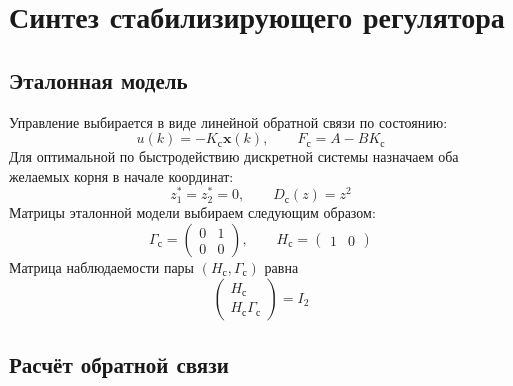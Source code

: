 \section{Синтез стабилизирующего регулятора}

\subsection{Эталонная модель}

Управление выбирается в виде линейной обратной связи по состоянию:
\begin{equation}
  u(k)=-K_{\text{с}}\bm x(k),
  \qquad F_{\text{с}}=A-BK_{\text{с}}
  \label{eq:stabilizing-control}
\end{equation}
Для оптимальной по быстродействию дискретной системы назначаем
оба желаемых корня в начале координат:
\begin{equation}
  z_1^*=z_2^*=0,
  \qquad D_{\text{с}}(z)=z^2
  \label{eq:stabilizing-polynomial}
\end{equation}
Матрицы эталонной модели выбираем следующим образом:
\begin{equation}
  \Gamma_{\text{с}}=\begin{pmatrix}0&1\\0&0\end{pmatrix},
  \qquad H_{\text{с}}=\begin{pmatrix}1&0\end{pmatrix}
  \label{eq:stabilizing-reference}
\end{equation}
Матрица наблюдаемости пары $(H_{\text{с}},\Gamma_{\text{с}})$ равна
\begin{equation}
  \begin{pmatrix}H_{\text{с}}\\H_{\text{с}}\Gamma_{\text{с}}\end{pmatrix}
  =I_2
  \label{eq:stabilizing-reference-observability}
\end{equation}

\subsection{Расчёт обратной связи}

